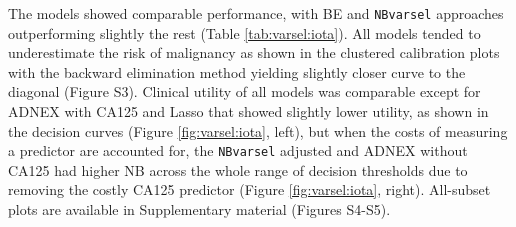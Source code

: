 The models showed comparable performance, with BE and \texttt{NBvarsel} approaches outperforming slightly the rest (Table \ref{tab:varsel:iota}). All models tended to underestimate the risk of malignancy as shown in the clustered calibration plots with the backward elimination method yielding slightly closer curve to the diagonal (Figure S3). Clinical utility of all models was comparable except for ADNEX with CA125 and Lasso that showed slightly lower utility, as shown in the decision curves (Figure \ref{fig:varsel:iota}, left), but when the costs of measuring a predictor are accounted for, the \texttt{NBvarsel} adjusted and ADNEX without CA125 had higher \gls{NB} across the whole range of decision thresholds due to removing the costly CA125 predictor (Figure \ref{fig:varsel:iota}, right). All-subset plots are available in Supplementary material (Figures S4-S5).

